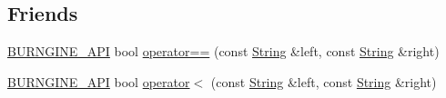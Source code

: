 \subsection*{Friends}
\begin{DoxyCompactItemize}
\item 
\hyperlink{_export_8h_a5040e4252a67428f940a23fa9dbfec7b}{B\-U\-R\-N\-G\-I\-N\-E\-\_\-\-A\-P\-I} bool \hyperlink{classburn_1_1_string_acd3ff7c79fe5f694755cde868e0b953a}{operator==} (const \hyperlink{classburn_1_1_string}{String} \&left, const \hyperlink{classburn_1_1_string}{String} \&right)
\item 
\hyperlink{_export_8h_a5040e4252a67428f940a23fa9dbfec7b}{B\-U\-R\-N\-G\-I\-N\-E\-\_\-\-A\-P\-I} bool \hyperlink{classburn_1_1_string_a4a8fbb4493570c7025b3ddf4d6577295}{operator$<$} (const \hyperlink{classburn_1_1_string}{String} \&left, const \hyperlink{classburn_1_1_string}{String} \&right)
\end{DoxyCompactItemize}
